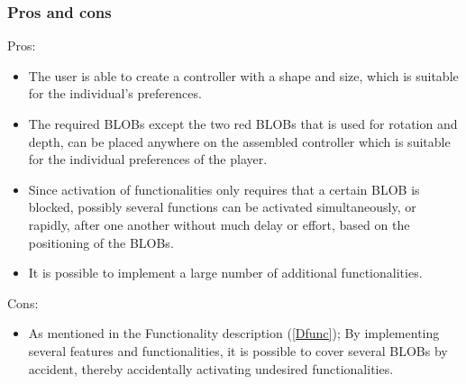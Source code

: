 \subsubsection*{Pros and cons}
Pros:
\begin{itemize}
\item The user is able to create a controller with a shape and size, which is suitable for the individual's preferences.
\item The required BLOBs except the two red BLOBs that is used for rotation and depth, can be placed anywhere on the assembled controller which is suitable for the individual preferences of the player. 
\item Since activation of functionalities only requires that a certain BLOB is blocked, possibly several functions can be activated simultaneously, or rapidly, after one another without much delay or effort, based on the positioning of the BLOBs.
\item It is possible to implement a large number of additional functionalities.
\end{itemize}
Cons:
\begin{itemize}
\item As mentioned in the Functionality description (\ref{Dfunc}); By implementing several features and functionalities, it is possible to cover several BLOBs by accident, thereby accidentally activating undesired functionalities.
\end{itemize}
